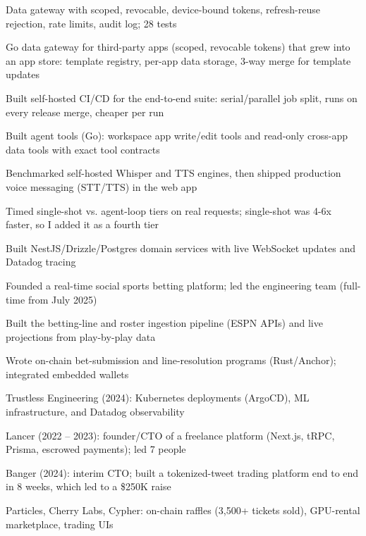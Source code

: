 \documentclass[print]{jack-resume}
\begin{document}
\begin{tightemize}
    \item Data gateway with scoped, revocable, device-bound tokens, refresh-reuse rejection, rate limits, audit log; 28 tests
    \item Go data gateway for third-party apps (scoped, revocable tokens) that grew into an app store: template registry, per-app data storage, 3-way merge for template updates
    \item Built self-hosted CI/CD for the end-to-end suite: serial/parallel job split, runs on every release merge, cheaper per run
    \item Built agent tools (Go): workspace app write/edit tools and read-only cross-app data tools with exact tool contracts
    \item Benchmarked self-hosted Whisper and TTS engines, then shipped production voice messaging (STT/TTS) in the web app
    \item Timed single-shot vs. agent-loop tiers on real requests; single-shot was 4-6x faster, so I added it as a fourth tier
\end{tightemize}
\sectionsep

\begin{tightemize}
    \item Built NestJS/Drizzle/Postgres domain services with live WebSocket updates and Datadog tracing
    \item Founded a real-time social sports betting platform; led the engineering team (full-time from July 2025)
    \item Built the betting-line and roster ingestion pipeline (ESPN APIs) and live projections from play-by-play data
    \item Wrote on-chain bet-submission and line-resolution programs (Rust/Anchor); integrated embedded wallets
\end{tightemize}
\sectionsep

\begin{tightemize}
    \item Trustless Engineering (2024): Kubernetes deployments (ArgoCD), ML infrastructure, and Datadog observability
    \item Lancer (2022 – 2023): founder/CTO of a freelance platform (Next.js, tRPC, Prisma, escrowed payments); led 7 people
    \item Banger (2024): interim CTO; built a tokenized-tweet trading platform end to end in 8 weeks, which led to a \$250K raise
    \item Particles, Cherry Labs, Cypher: on-chain raffles (3,500+ tickets sold), GPU-rental marketplace, trading UIs
\end{tightemize}
\sectionsep
\end{document}
